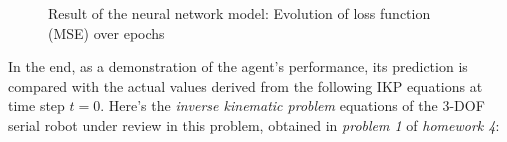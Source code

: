 \documentclass[conference]{IEEEtran}
\begin{document}
\begin{figure}[htbp]
    \centering
     \vfill
    \caption{Result of the neural network model: Evolution of loss function (MSE) over epochs}
    \label{fig:prob5a}
\end{figure}



In the end, as a demonstration of the agent's performance, its prediction is compared with the actual values derived from the following IKP equations at time step $t = 0$. Here's the \textit{inverse kinematic problem} equations of the 3-DOF serial robot under review in this problem, obtained in \textit{problem 1} of \textit{homework 4}:
\end{document}
